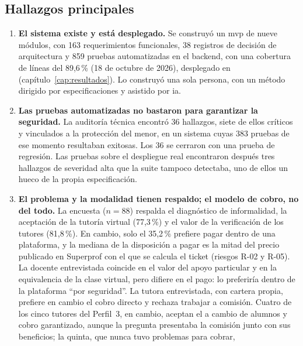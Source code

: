 \subsection{Hallazgos principales}

\begin{enumerate}
    \item \textbf{El sistema existe y está desplegado.} Se construyó un
          \gls{mvp} de nueve módulos, con 163 requerimientos funcionales,
          38 registros de decisión de arquitectura y 859 pruebas
          automatizadas en el backend, con una cobertura de líneas del
          89,6\,\% (18 de octubre de 2026), desplegado en 
          (capítulo~\ref{cap:resultados}). Lo construyó una sola persona,
          con un método dirigido por especificaciones y asistido por
          \gls{ia}.
    \item \textbf{Las pruebas automatizadas no bastaron para garantizar la
          seguridad.} La auditoría técnica encontró 36 hallazgos, siete
          de ellos críticos y vinculados a la protección del menor, en un
          sistema cuyas 383 pruebas de ese momento resultaban exitosas.
          Los 36 se cerraron con una prueba de regresión. Las pruebas
          sobre el despliegue real encontraron después tres hallazgos de
          severidad alta que la suite tampoco detectaba, uno de ellos un
          hueco de la propia especificación.
    \item \textbf{El problema y la modalidad tienen respaldo; el modelo de
          cobro, no del todo.} La encuesta ($n = 88$) respalda el
          diagnóstico de informalidad, la aceptación de la tutoría virtual
          (77,3\,\%) y el valor de la verificación de los tutores
          (81,8\,\%). En cambio, solo el 35,2\,\% prefiere pagar dentro de
          una plataforma, y la mediana de la disposición a pagar es la
          mitad del precio publicado en Superprof con el que se calcula el
          ticket (riesgos R-02 y R-05). La docente entrevistada coincide en
          el valor del apoyo particular y en la equivalencia de la clase
          virtual, pero difiere en el pago: lo preferiría dentro de la
          plataforma ``por seguridad''. La tutora entrevistada, con
          cartera propia, prefiere en cambio el cobro directo y rechaza
          trabajar a comisión. Cuatro de los cinco tutores del Perfil~3,
          en cambio, aceptan el \comision{} a cambio de alumnos y cobro
          garantizado, aunque la pregunta presentaba la comisión junto con
          sus beneficios; la quinta, que nunca tuvo problemas para cobrar,

\end{enumerate}
